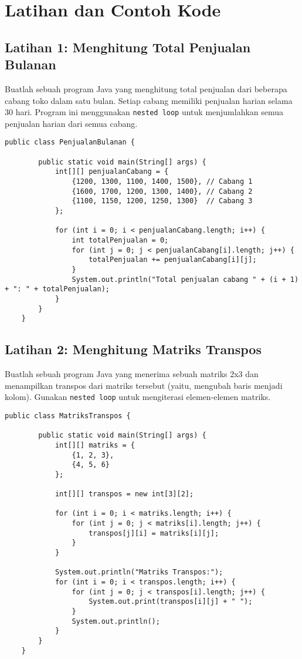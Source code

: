 \section{Latihan dan Contoh Kode}

\subsection{Latihan 1: Menghitung Total Penjualan Bulanan}

Buatlah sebuah program Java yang menghitung total penjualan dari beberapa cabang toko dalam satu bulan. Setiap cabang memiliki penjualan harian selama 30 hari. Program ini menggunakan \texttt{nested loop} untuk menjumlahkan semua penjualan harian dari semua cabang.

\begin{lstlisting}[style=JavaStyle]
	public class PenjualanBulanan {
		
		public static void main(String[] args) {
			int[][] penjualanCabang = {
				{1200, 1300, 1100, 1400, 1500}, // Cabang 1
				{1600, 1700, 1200, 1300, 1400}, // Cabang 2
				{1100, 1150, 1200, 1250, 1300}  // Cabang 3
			};
			
			for (int i = 0; i < penjualanCabang.length; i++) {
				int totalPenjualan = 0;
				for (int j = 0; j < penjualanCabang[i].length; j++) {
					totalPenjualan += penjualanCabang[i][j];
				}
				System.out.println("Total penjualan cabang " + (i + 1) + ": " + totalPenjualan);
			}
		}
	}
\end{lstlisting}

\subsection{Latihan 2: Menghitung Matriks Transpos}

Buatlah sebuah program Java yang menerima sebuah matriks 2x3 dan menampilkan transpos dari matriks tersebut (yaitu, mengubah baris menjadi kolom). Gunakan \texttt{nested loop} untuk mengiterasi elemen-elemen matriks.

\begin{lstlisting}[style=JavaStyle]
	public class MatriksTranspos {
		
		public static void main(String[] args) {
			int[][] matriks = {
				{1, 2, 3},
				{4, 5, 6}
			};
			
			int[][] transpos = new int[3][2];
			
			for (int i = 0; i < matriks.length; i++) {
				for (int j = 0; j < matriks[i].length; j++) {
					transpos[j][i] = matriks[i][j];
				}
			}
			
			System.out.println("Matriks Transpos:");
			for (int i = 0; i < transpos.length; i++) {
				for (int j = 0; j < transpos[i].length; j++) {
					System.out.print(transpos[i][j] + " ");
				}
				System.out.println();
			}
		}
	}
\end{lstlisting}

